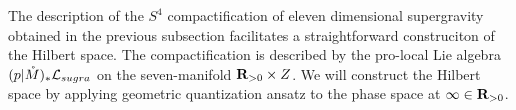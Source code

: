 


%
%
%
%
%
\parsec[s:hilbertspace]
The description of the $S^{4}$ compactification of eleven dimensional supergravity obtained in the previous subsection facilitates a straightforward construciton of the Hilbert space. The compactification is described by the pro-local Lie algebra $(p|\mathring M)_{*} \mathcal L_{sugra}$ on the seven-manifold $\mathbf{R}_{>0}\times Z$. We will construct the Hilbert space by applying geometric quantization ansatz to the phase space at $\infty \in \mathbf{R}_{>0}$.

